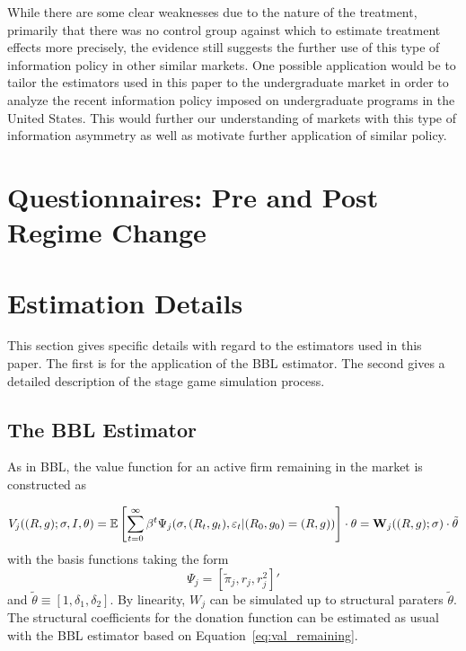 \documentclass[12pt]{article}
\theoremstyle{definition}
\begin{document}
While there are some clear weaknesses due to the nature of the treatment, primarily that there was no control group against which to estimate treatment effects more precisely, the evidence still suggests the further use of this type of information policy in other similar markets. One possible application would be to tailor the estimators used in this paper to the undergraduate market in order to analyze the recent information policy imposed on undergraduate programs in the United States. This would further our understanding of markets with this type of information asymmetry as well as motivate further application of similar policy.


\appendix
\appendixpage

\section{Questionnaires: Pre and Post Regime Change}
\label{app:questionnaires}





\section{Estimation Details}
This section gives specific details with regard to the estimators used in this paper. The first is for the application of the BBL estimator. The second gives a detailed description of the stage game simulation process.

\subsection{The BBL Estimator}
\label{app:bbl_estimator}
As in BBL, the value function for an active firm remaining in the market is constructed as

\begin{equation}
	V_j((R, g); \sigma, I, \theta) = \mathbb{E}\left[\sum_{t=0}^{\infty}\beta^t\Psi_j(\sigma, (R_t, g_t), \varepsilon_t|(R_0, g_0) = (R, g))\right]\cdot \theta = {\bf W}_j((R, g); \sigma)\cdot \tilde{\theta}
\label{eq:val_remaining}
\end{equation}
with the basis functions taking the form
\[
	\Psi_j = [\tilde{\pi}_j, r_j, r_j^2]'
\]
and $\tilde{\theta}\equiv[1, \delta_1, \delta_2]$. By linearity, $W_j$ can be simulated up to structural paraters $\tilde{\theta}$. The structural coefficients for the donation function can be estimated as usual with the BBL estimator based on Equation~\eqref{eq:val_remaining}.
\end{document}
